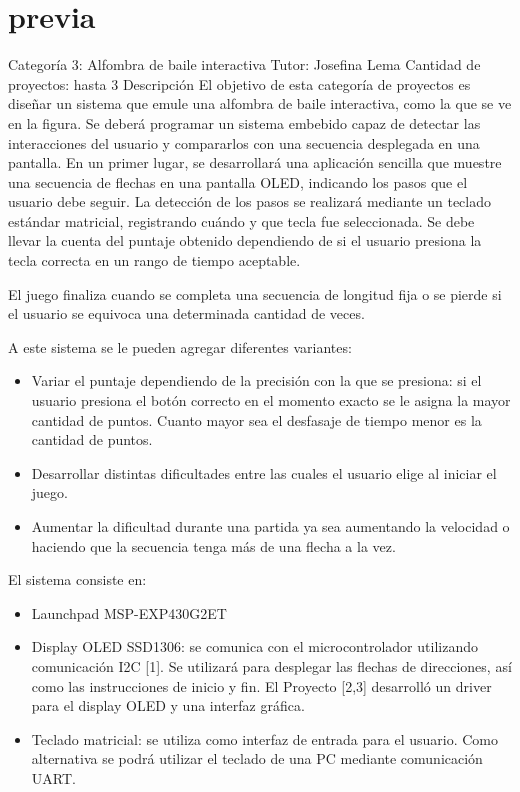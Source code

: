 \documentclass[a4paper,12pt]{article}
\begin{document}
\begin{linenumbers}
\begin{tcolorbox}
  \end{tcolorbox}


  \newpage
  \setcounter{page}{1}
  \tableofcontents

  \section{previa}
  \label{sec:previa}

  Categoría 3: Alfombra de baile interactiva Tutor: Josefina Lema Cantidad de proyectos: hasta 3 Descripción El objetivo de esta categoría de proyectos es diseñar un sistema que emule una alfombra de baile interactiva, como la que se ve en la figura. Se deberá programar un sistema embebido capaz de detectar las interacciones del usuario y compararlos con una secuencia desplegada en una pantalla. En un primer lugar, se desarrollará una aplicación sencilla que muestre una secuencia de flechas en una pantalla OLED, indicando los pasos que el usuario debe seguir. 
La detección de los pasos se realizará mediante un teclado estándar matricial, registrando cuándo y que tecla fue seleccionada. Se debe llevar la cuenta del puntaje obtenido dependiendo de si el usuario presiona la tecla correcta en un rango de tiempo aceptable. 

El juego finaliza cuando se completa una secuencia de longitud fija o se pierde si el usuario se equivoca una determinada cantidad de veces. 



A este sistema se le pueden agregar diferentes variantes:
\begin{itemize}
    \item Variar el puntaje dependiendo de la precisión con la que se presiona: si el usuario presiona el botón correcto en el momento exacto se le asigna la mayor cantidad de puntos. Cuanto mayor sea el desfasaje de tiempo menor es la cantidad de puntos.
    \item Desarrollar distintas dificultades entre las cuales el usuario elige al iniciar el juego.
    \item Aumentar la dificultad durante una partida ya sea aumentando la velocidad o haciendo que la secuencia tenga más de una flecha a la vez.
\end{itemize}

El sistema consiste en:
\begin{itemize}
    \item Launchpad MSP-EXP430G2ET
    \item Display OLED SSD1306: se comunica con el microcontrolador utilizando comunicación I2C [1]. Se utilizará para desplegar las flechas de direcciones, así como las instrucciones de inicio y fin. El Proyecto [2,3] desarrolló un driver para el display OLED y una interfaz gráfica.
    \item Teclado matricial: se utiliza como interfaz de entrada para el usuario. Como alternativa se podrá utilizar el teclado de una PC mediante comunicación UART.
\end{itemize}


\end{linenumbers}
\end{document}
